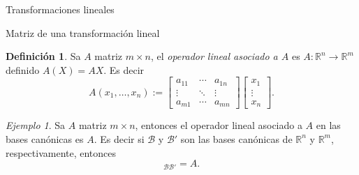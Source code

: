 \documentclass[a4paper,12pt,twoside,spanish,reqno]{amsbook}
\numberwithin{equation}{section}
\theoremstyle{definition}
\newtheorem{definicion}[teorema]{Definici\'on}
\theoremstyle{remark}
\newtheorem*{ejemplo*}{Ejemplo}
\newcommand{\R}{\mathbb R}
\begin{document}
\begin{chapter}{Transformaciones lineales}
\begin{section}{Matriz de una transformación lineal}
        
            \begin{definicion}
                Sa $A$ matriz $m \times n$,  el \textit{operador lineal asociado a $A$} es $A: \R^n \to \R^m$  definido $A(X) = AX$. Es decir
                \begin{equation}
                    A(x_1,\ldots,x_n):= \begin{bmatrix} a_{11} &\cdots &a_{1n} \\ \vdots &\ddots& \vdots \\a_{m1} &\cdots &a_{mn}
                    \end{bmatrix}\begin{bmatrix}x_1\\\vdots\\x_n\end{bmatrix}.
                \end{equation}
            \end{definicion}	
        
            \begin{ejemplo*}
                    Sa $A$ matriz $m \times n$, entonces  el operador lineal asociado a $A$ en las bases canónicas es $A$. Es decir  si $\mathcal B$ y $\mathcal B'$ son las bases canónicas de $\R^n$ y $\R^m$,  respectivamente, entonces 
                    \begin{equation*}
                        [A]_{\mathcal B\mathcal B'} =A.
                    \end{equation*}
            \end{ejemplo*}	
            

\end{section}
\end{chapter}
\end{document}
